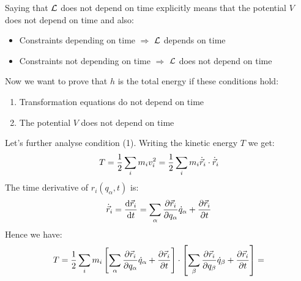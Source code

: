 Saying that $\mathcal{L}$ does not depend on time explicitly means that the potential $V$ does not depend on time and also:
\begin{itemize}
    \item Constraints depending on time $\Rightarrow$ $\mathcal{L}$ depends on time
    \item Constraints not depending on time $\Rightarrow$ $\mathcal{L}$ does not depend on time
\end{itemize}
Now we want to prove that $h$ is the total energy if these conditions hold:
\begin{enumerate}
    \item Transformation equations do not depend on time
    \item The potential $V$ does not depend on time
\end{enumerate}
Let's further analyse condition (1). Writing the kinetic energy $T$ we get:
\begin{equation}
    T = \dfrac{1}{2}\displaystyle\sum_i m_i v_i^2 = \dfrac{1}{2}\displaystyle\sum_i m_i \dot{\vec{r}}_i \cdot \dot{\vec{r}}_i
\end{equation}
The time derivative of $r_i(q_{\alpha},t)$ is:
\begin{equation}
    \dot{\vec{r}}_i = \dfrac{\mathrm{d}\vec{r}_i}{\mathrm{d}t} = \displaystyle\sum_{\alpha}\dfrac{\partial \vec{r}_i}{\partial q_{\alpha}}\dot{q}_{\alpha} + \dfrac{\partial \vec{r}_i}{\partial t}
\end{equation}
Hence we have:
\begin{equation}
    T = \dfrac{1}{2}\displaystyle\sum_i m_i \left[\displaystyle\sum_{\alpha}\dfrac{\partial \vec{r}_i}{\partial q_{\alpha}}\dot{q}_{\alpha} + \dfrac{\partial \vec{r}_i}{\partial t}\right] \cdot \left[\displaystyle\sum_{\beta}\dfrac{\partial \vec{r}_i}{\partial q_{\beta}}\dot{q}_{\beta} + \dfrac{\partial \vec{r}_i}{\partial t}\right] =
\end{equation}

